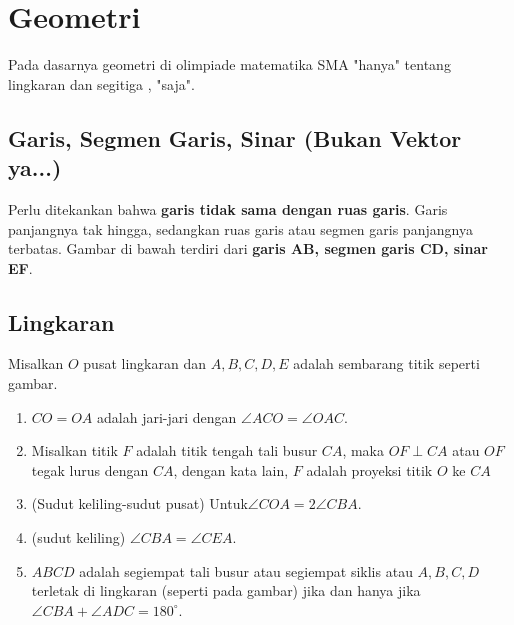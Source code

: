 \documentclass[11pt]{scrartcl}
\begin{document}
    \section{Geometri}
    Pada dasarnya geometri di olimpiade matematika SMA "hanya" tentang lingkaran dan segitiga , "saja". 
    
    \subsection{Garis, Segmen Garis, Sinar (Bukan Vektor ya...)}
    Perlu ditekankan bahwa \textbf{garis tidak sama dengan ruas garis}. Garis panjangnya tak hingga, sedangkan ruas garis atau segmen garis panjangnya terbatas. Gambar di bawah terdiri dari \textbf{garis AB, segmen garis CD, sinar EF}.
\begin{center}
\end{center}
    
    \subsection{Lingkaran}
    
    
Misalkan $O$ pusat lingkaran dan $A,B,C,D,E$ adalah sembarang titik seperti gambar.
\begin{enumerate}
    \item $CO=OA$ adalah jari-jari dengan $\angle ACO = \angle OAC$.
    \item Misalkan titik $F$ adalah titik tengah tali busur $CA$, maka $OF \perp CA$ atau $OF$ tegak lurus dengan $CA$, dengan kata lain, $F$ adalah proyeksi titik $O$ ke $CA$
    \item (Sudut keliling-sudut pusat) Untuk$\angle COA = 2\angle CBA$.
    \item (sudut keliling) $\angle CBA = \angle CEA$.
    \item $ABCD$ adalah segiempat tali busur atau segiempat siklis  atau $A,B,C,D$ terletak di lingkaran (seperti pada gambar) jika dan hanya jika $\angle CBA + \angle ADC = 180^\circ$.
\end{enumerate}
\end{document}
